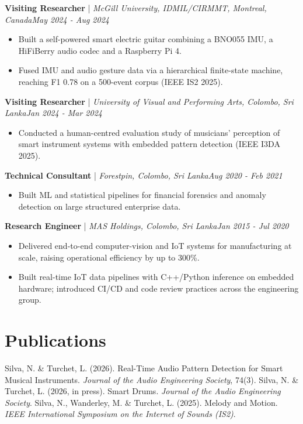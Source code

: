 \documentclass[11pt]{article}
\newenvironment{cvrole}[5]{%
  \par\noindent\textbf{\large #1} | \textit{\small #2, #3}\hfill \textit{\small #4 - #5}\par
  \begin{itemize}[leftmargin=2em, itemsep=-0.3em, topsep=-0.5em]%
}{%
  \end{itemize}\par\noindent\mbox{}\par\vspace{0.1em}%
}
\begin{document}
\begin{cvrole}{Visiting Researcher}{McGill University, IDMIL/CIRMMT}{Montreal, Canada}{May 2024}{Aug 2024}
\item Built a self-powered smart electric guitar combining a BNO055 IMU, a HiFiBerry audio codec and a Raspberry Pi 4.
\item Fused IMU and audio gesture data via a hierarchical finite-state machine, reaching F1 0.78 on a 500-event corpus (IEEE IS2 2025).
\end{cvrole}

\begin{cvrole}{Visiting Researcher}{University of Visual and Performing Arts}{Colombo, Sri Lanka}{Jan 2024}{Mar 2024}
\item Conducted a human-centred evaluation study of musicians' perception of smart instrument systems with embedded pattern detection (IEEE I3DA 2025).
\end{cvrole}

\begin{cvrole}{Technical Consultant}{Forestpin}{Colombo, Sri Lanka}{Aug 2020}{Feb 2021}
\item Built ML and statistical pipelines for financial forensics and anomaly detection on large structured enterprise data.
\end{cvrole}

\begin{cvrole}{Research Engineer}{MAS Holdings}{Colombo, Sri Lanka}{Jan 2015}{Jul 2020}
\item Delivered end-to-end computer-vision and IoT systems for manufacturing at scale, raising operational efficiency by up to 300\%.
\item Built real-time IoT data pipelines with C++/Python inference on embedded hardware; introduced CI/CD and code review practices across the engineering group.
\end{cvrole}

\section*{Publications}
Silva, N. \& Turchet, L. (2026). Real-Time Audio Pattern Detection for Smart Musical Instruments. \textit{Journal of the Audio Engineering Society}, 74(3). Silva, N. \& Turchet, L. (2026, in press). Smart Drums. \textit{Journal of the Audio Engineering Society}. Silva, N., Wanderley, M. \& Turchet, L. (2025). Melody and Motion. \textit{IEEE International Symposium on the Internet of Sounds (IS2)}.
\end{document}
